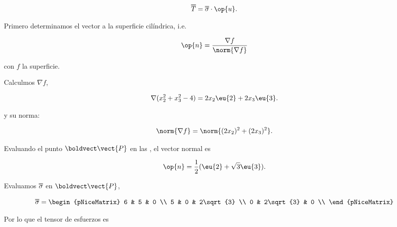 \documentclass[../main.tex]{subfiles}
\begin{document}
\begin{equation*}
	\dbloverline{T} = \dbloverline{\sigma}\cdot \op{u}.
\end{equation*}

Primero determinamos el vector a la superficie cilíndrica, i.e.

\begin{equation*}
	\op{n} = \dfrac{\nabla{f}}{\norm{\nabla{f}}}
\end{equation*}

con \(f\) la superficie.

Calculmos \(\nabla{f}\),

\begin{equation}
	\nabla{(x_{2}^{2} + x_{3}^{2} - 4)} = 2x_{2}\eu{2} + 2x_{3}\eu{3}.
	\label{eq:gradient-f}
\end{equation}

y su norma:

\begin{equation}
	\norm{\nabla{f}} = \norm{(2x_{2})^{2} + (2x_{3})^{2}}.
	\label{eq:norm-gradient}
\end{equation}

Evaluando el punto \(\boldvect\vect{P}\) en las ,
el vector normal es

\begin{equation*}
	\op{n} = \dfrac{1}{2}(\eu{2} + \sqrt{3}\eu{3}).
\end{equation*}

Evaluamos \(\dbloverline{\sigma}\) en \(\boldvect\vect{P}\),

\begin{equation*}
	\dbloverline{\sigma} = \begin{pNiceMatrix}
		6 & 5         & 0         \\
		5 & 0         & 2\sqrt{3} \\
		0 & 2\sqrt{3} & 0         \\
	\end{pNiceMatrix}
\end{equation*}

Por lo que el tensor de esfuerzos es
\end{document}
